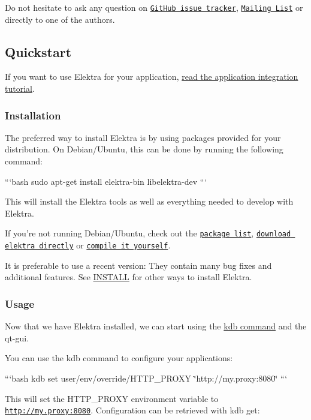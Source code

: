 Do not hesitate to ask any question on \href{https://github.com/ElektraInitiative/libelektra/issues}{\tt Git\+Hub issue tracker}, \href{https://lists.sourceforge.net/lists/listinfo/registry-list}{\tt Mailing List} or directly to one of the authors.

\subsection*{Quickstart}

If you want to use Elektra for your application, \hyperlink{doc_tutorials_application-integration_md}{read the application integration tutorial}.

\subsubsection*{Installation}

The preferred way to install Elektra is by using packages provided for your distribution. On Debian/\+Ubuntu, this can be done by running the following command\+:

```bash sudo apt-\/get install elektra-\/bin libelektra-\/dev ```

This will install the Elektra tools as well as everything needed to develop with Elektra.

If you're not running Debian/\+Ubuntu, check out the \href{#packages}{\tt package list}, \href{#download}{\tt download elektra directly} or \href{#compiling}{\tt compile it yourself}.

It is preferable to use a recent version\+: They contain many bug fixes and additional features. See \hyperlink{doc_INSTALL_md}{I\+N\+S\+T\+A\+L\+L} for other ways to install Elektra.

\subsubsection*{Usage}

Now that we have Elektra installed, we can start using the \hyperlink{md_doc_help_kdb_doc_help_kdb_md}{kdb command} and the qt-\/gui.

You can use the {\ttfamily kdb} command to configure your applications\+:

```bash kdb set user/env/override/\+H\+T\+T\+P\+\_\+\+P\+R\+O\+X\+Y \char`\"{}http\+://my.\+proxy\+:8080\char`\"{} ```

This will set the {\ttfamily H\+T\+T\+P\+\_\+\+P\+R\+O\+X\+Y} environment variable to {\ttfamily \href{http://my.proxy:8080}{\tt http\+://my.\+proxy\+:8080}}. Configuration can be retrieved with {\ttfamily kdb get}\+:

